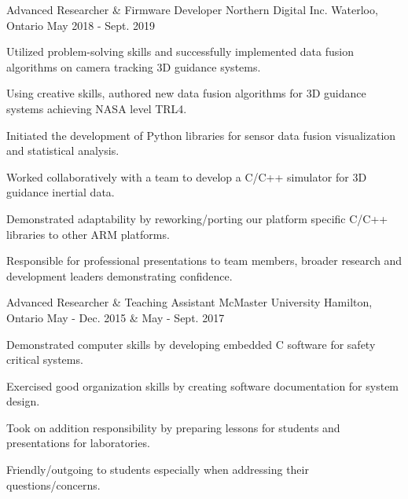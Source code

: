 
\begin{cventries}

  \cventry
    {Advanced Researcher \& Firmware Developer} %
    {Northern Digital Inc.} %
    {Waterloo, Ontario} %
    {May 2018 - Sept. 2019} %
    {
      \begin{cvitems} %
        \item {Utilized problem-solving skills and successfully implemented data fusion algorithms on camera tracking 3D guidance systems.}
        \item {Using creative skills, authored new data fusion algorithms for 3D guidance systems achieving NASA level TRL4.}
        \item {Initiated the development of Python libraries for sensor data fusion visualization and statistical analysis.}
        \item {Worked collaboratively with a team to develop a C/C++ simulator for 3D guidance inertial data.}
        \item {Demonstrated adaptability by reworking/porting our platform specific C/C++ libraries to other ARM platforms.}
        \item {Responsible for professional presentations to team members, broader research and development leaders demonstrating confidence.}
      \end{cvitems}
    }

  \cventry
    {Advanced Researcher \& Teaching Assistant} %
    {McMaster University} %
    {Hamilton, Ontario} %
    {May - Dec. 2015 \& May - Sept. 2017} %
    {
      \begin{cvitems} %
        \item {Demonstrated computer skills by developing embedded C software for safety critical systems.}
        \item {Exercised good organization skills by creating software documentation for system design.}
        \item {Took on addition responsibility by preparing lessons for students and presentations for laboratories.}
        \item {Friendly/outgoing to students especially when addressing their questions/concerns.}
      \end{cvitems}
    }


\end{cventries}

